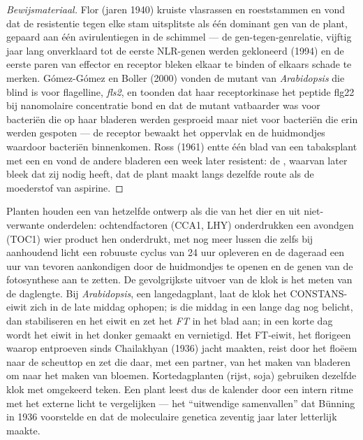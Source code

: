 \begin{proof}[Bewijsmateriaal]
Flor (jaren 1940) kruiste vlasrassen en roeststammen en vond dat de
resistentie tegen elke stam uitsplitste als één dominant gen van de
plant, gepaard aan één avirulentiegen in de schimmel --- de
gen-tegen-genrelatie, vijftig jaar lang onverklaard tot de eerste
NLR-genen werden gekloneerd (1994) en de eerste paren van effector en
receptor bleken elkaar te binden of elkaars schade te merken.
Gómez-Gómez en Boller (2000) vonden de mutant van \emph{Arabidopsis}
die blind is voor flagelline, \emph{fls2}, en toonden dat haar
receptorkinase het peptide flg22 bij nanomolaire concentratie bond en
dat de mutant vatbaarder was voor bacteriën die op haar bladeren werden
gesproeid maar niet voor bacteriën die erin werden gespoten --- de
receptor bewaakt het oppervlak en de huidmondjes waardoor bacteriën
binnenkomen. Ross (1961) entte één blad van een tabaksplant met een
 en vond de andere bladeren een week later resistent: de
, waarvan later bleek dat zij
 nodig heeft, dat de plant maakt langs dezelfde route als de
moederstof van aspirine.
\end{proof}

\begin{example}\label{ex:b3:plant-molecular-physiology:clock}
Planten houden een  van hetzelfde ontwerp als die van
het dier en uit niet-verwante onderdelen: ochtendfactoren (CCA1, LHY)
onderdrukken een avondgen (TOC1) wier product hen onderdrukt, met nog
meer lussen die zelfs bij aanhoudend licht een robuuste cyclus van 24
uur opleveren en de dageraad een uur van tevoren aankondigen door de
huidmondjes te openen en de genen van de fotosynthese aan te zetten. De
gevolgrijkste uitvoer van de klok is het meten van de daglengte. Bij
\emph{Arabidopsis}, een langedagplant, laat de klok het CONSTANS-eiwit
zich in de late middag ophopen; is die middag in een lange dag nog
belicht, dan stabiliseren  en  het eiwit en zet
het \emph{FT} in het blad aan; in een korte dag wordt het eiwit in het
donker gemaakt en vernietigd. Het FT-eiwit, het florigeen waarop
entproeven sinds Chailakhyan (1936) jacht maakten, reist door het
floëem naar de scheuttop en zet die daar, met een partner, van het
maken van bladeren om naar het maken van bloemen. Kortedagplanten
(rijst, soja) gebruiken dezelfde klok met omgekeerd teken. Een plant
leest dus de kalender door een intern ritme met het externe licht te
vergelijken --- het ``uitwendige samenvallen'' dat Bünning in 1936
voorstelde en dat de moleculaire genetica zeventig jaar later
letterlijk maakte.
\end{example}

